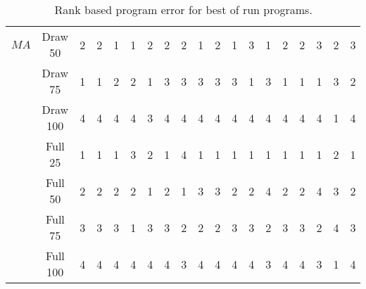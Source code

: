 \begin{sidewaystable*}[ht]
\begin{tabular}{ c | c  |c c c c c c c c c c c c c c c c c }
$M A$  & Draw 50 & 2 & 2 & 1 & 1 & 2 & 2 & 2 & 1 & 2 & 1 & 3 & 1 & 2 & 2 & 3 & 2 & 3 \\
 & Draw 75 & 1 & 1 & 2 & 2 & 1 & 3 & 3 & 3 & 3 & 3 & 1 & 3 & 1 & 1 & 1 & 3 & 2 \\
 & Draw 100 & 4 & 4 & 4 & 4 & 3 & 4 & 4 & 4 & 4 & 4 & 4 & 4 & 4 & 4 & 4 & 1 & 4 \\
 \hline
 & Full 25 & 1 & 1 & 1 & 3 & 2 & 1 & 4 & 1 & 1 & 1 & 1 & 1 & 1 & 1 & 1 & 2 & 1 \\
 & Full 50 & 2 & 2 & 2 & 2 & 1 & 2 & 1 & 3 & 3 & 2 & 2 & 4 & 2 & 2 & 4 & 3 & 2 \\
 & Full 75 & 3 & 3 & 3 & 1 & 3 & 3 & 2 & 2 & 2 & 3 & 3 & 2 & 3 & 3 & 2 & 4 & 3 \\
 & Full 100 & 4 & 4 & 4 & 4 & 4 & 4 & 3 & 4 & 4 & 4 & 4 & 3 & 4 & 4 & 3 & 1 & 4 \\
\end{tabular}
\caption{Rank based program error for best of run programs.}
\label{table:rank_program_error_draw_full}
\end{sidewaystable*}
